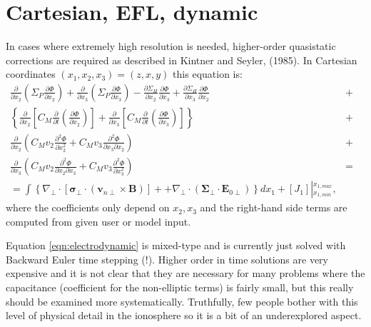 \documentclass[11pt,letterpaper]{article}
\begin{document}
\section{Cartesian, EFL, dynamic}

In cases where extremely high resolution is needed, higher-order quasistatic corrections are required as described in Kintner and Seyler, (1985).  In Cartesian coordinates $(x_1,x_2,x_3)=(z,x,y)$ this equation is:  
\begin{eqnarray}
\frac{\partial}{\partial x_2} \left( \Sigma_P \frac{\partial \Phi}{\partial x_2} \right) + \frac{\partial}{\partial x_3} \left( \Sigma_P \frac{\partial \Phi}{\partial x_3} \right) -  \frac{\partial \Sigma_H}{\partial x_2} \frac{\partial \Phi}{\partial x_3} + \frac{\partial \Sigma_H}{\partial x_3} \frac{\partial \Phi}{\partial x_2} &+& \nonumber \\ 
\left\{ \frac{\partial}{\partial x_2} \left[ C_M \frac{\partial}{\partial t} \left( \frac{\partial \Phi}{\partial x_2} \right) \right] + \frac{\partial}{\partial x_3} \left[ C_M \frac{\partial}{\partial t} \left( \frac{\partial \Phi}{\partial x_3} \right) \right] \right\} &+& \nonumber \\
\frac{\partial}{\partial x_2} \left( C_M v_2 \frac{\partial^2 \Phi}{\partial x_2^2} + C_M v_3 \frac{\partial^2 \Phi}{\partial x_3 \partial x_2} \right) &+& \nonumber \\
\frac{\partial}{\partial x_3} \left( C_M v_2 \frac{\partial^2 \Phi}{\partial x_2 \partial x_3} + C_M v_3 \frac{\partial^2 \Phi}{\partial x_3^2} \right) &=& \nonumber \\
= \int \left\{ \nabla_\perp \cdot \left[ \boldsymbol{\sigma}_\perp \cdot \left( \mathbf{v}_{n\perp} \times \mathbf{B} \right) \right] + + \nabla_\perp \cdot \left( \boldsymbol{\Sigma}_\perp \cdot \mathbf{E}_{0\perp} \right) \right\} d x_1 + \left[J_1 \right] \left|^{x_{1,max}}_{x_{1,min}} \right. , \label{eqn:electrodynamic}
\end{eqnarray}
where the coefficients only depend on $x_2,x_3$ and the right-hand side terms are computed from given user or model input.  

Equation \ref{eqn:electrodynamic} is mixed-type and is currently just solved with Backward Euler time stepping (!).  Higher order in time solutions are very expensive and it is not clear that they are necessary for many problems where the capacitance (coefficient for the non-elliptic terms) is fairly small, but this really should be examined more systematically.  Truthfully, few people bother with this level of physical detail in the ionosphere so it is a bit of an underexplored aspect.  
\end{document}

